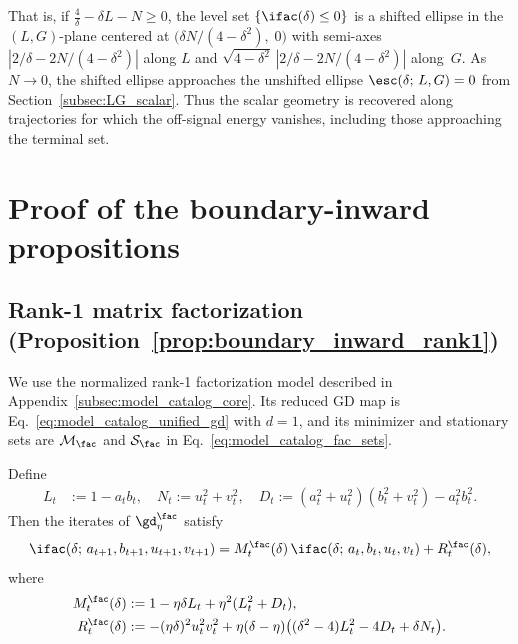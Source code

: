 \documentclass{article}
\begin{document}
That is, if $\frac{4}{\delta} - \delta L - N \ge 0$, the level set $\{\ifac(\delta) \le 0\}$ is a shifted
ellipse in the $(L,G)$-plane centered at
$\bigl(\delta N / (4-\delta^2),\; 0\bigr)$ with semi-axes
$|2/\delta - 2N/(4-\delta^2)|$ along $L$ and
$\sqrt{4-\delta^2}\,|2/\delta - 2N/(4-\delta^2)|$ along~$G$.
As $N \to 0$, the shifted ellipse approaches the unshifted ellipse
$\esc(\delta;\,L,G) = 0$ from Section~\ref{subsec:LG_scalar}. Thus the scalar
geometry is recovered along trajectories for which the off-signal energy
vanishes, including those approaching the terminal set.

\section{Proof of the boundary-inward propositions}
\label{sec:boundary_inward_proofs}

\subsection{Rank-1 matrix factorization (Proposition~\ref{prop:boundary_inward_rank1})}
\label{app:boundary_inward_fac}
We use the normalized rank-1 factorization model described in
Appendix~\ref{subsec:model_catalog_core}. Its reduced GD map is
Eq.~\eqref{eq:model_catalog_unified_gd} with $d=1$, and its minimizer and
stationary sets are $\mathcal M_\fac$ and $\mathcal S_\fac$ in
Eq.~\eqref{eq:model_catalog_fac_sets}.

Define
\begin{align}
L_t &:= 1-a_tb_t, \quad N_t := u_t^2+v_t^2, \quad D_t := (a_t^2+u_t^2)(b_t^2+v_t^2)-a_t^2b_t^2.
\end{align}
Then the iterates of $\gd_\eta^\fac$ satisfy
\begin{align}
\ifac(\delta;\, a_{t+1},b_{t+1},u_{t+1},v_{t+1})
= M_t^\fac(\delta)\,\ifac(\delta;\, a_t,b_t,u_t,v_t) + R_t^\fac(\delta),
\end{align}
where
\begin{align}
M_t^\fac(\delta) &:= 1-\eta\delta L_t + \eta^2(L_t^2+D_t), \label{eq:M_t_def}\\
R_t^\fac(\delta) &:=
-(\eta\delta)^2 u_t^2 v_t^2
+\eta(\delta-\eta)\bigl((\delta^2-4)L_t^2-4D_t+\delta N_t\bigr).
\label{eq:R_t_def}
\end{align}
\end{document}

